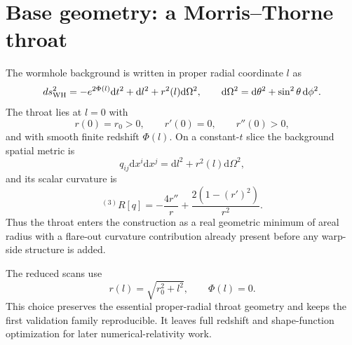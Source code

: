 \documentclass[11pt]{article}
\newcommand{\dd}{\mathrm{d}}
\begin{document}
\section{Base geometry: a Morris--Thorne throat}
The wormhole background is written in proper radial coordinate $l$ as
\begin{equation}
 ds^2_{\rm WH}=-e^{2\Phi(l)}\dd t^2+\dd l^2+r^2(l)\dd\Omega^2,
 \qquad
 \dd\Omega^2=\dd\theta^2+\sin^2\theta\,\dd\phi^2.
\end{equation}
The throat lies at $l=0$ with
\begin{equation}
 r(0)=r_0>0,
 \qquad r'(0)=0,
 \qquad r''(0)>0,
\end{equation}
and with smooth finite redshift $\Phi(l)$.  On a constant-$t$ slice the background spatial metric is
\begin{equation}
 q_{ij}\dd x^i\dd x^j=\dd l^2+r^2(l)\dd\Omega^2,
\end{equation}
and its scalar curvature is
\begin{equation}
 {}^{(3)}R[q]=-
 \frac{4r''}{r}+\frac{2\left(1-(r')^2\right)}{r^2}.
\end{equation}
Thus the throat enters the construction as a real geometric minimum of areal radius with a flare-out curvature contribution already present before any warp-side structure is added.

The reduced scans use
\begin{equation}
 r(l)=\sqrt{r_0^2+l^2},\qquad \Phi(l)=0.
\end{equation}
This choice preserves the essential proper-radial throat geometry and keeps the first validation family reproducible.  It leaves full redshift and shape-function optimization for later numerical-relativity work.
\end{document}
